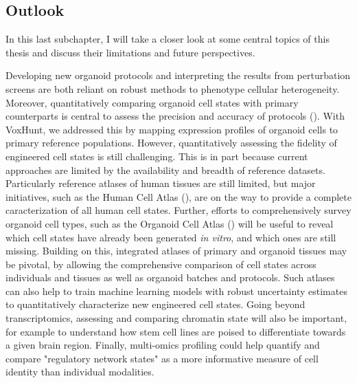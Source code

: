 \subsection{Outlook}

In this last subchapter, I will take a closer look at some central topics of this thesis and discuss their limitations and future perspectives.

Developing new organoid protocols and interpreting the results from perturbation screens are both reliant on robust methods to phenotype cellular heterogeneity. Moreover, quantitatively comparing organoid cell states with primary counterparts is central to assess the precision and accuracy of protocols (\cite{camp_single-cell_2018}). With VoxHunt, we addressed this by mapping expression profiles of organoid cells to primary reference populations. However, quantitatively assessing the fidelity of engineered cell states is still challenging. This is in part because current approaches are limited by the availability and breadth of reference datasets. Particularly reference atlases of human tissues are still limited, but major initiatives, such as the Human Cell Atlas (\cite{regev_human_2017}), are on the way to provide a complete caracterization of all human cell states. Further, efforts to comprehensively survey organoid cell types, such as the Organoid Cell Atlas (\cite{the_human_cell_atlas_biological_network_organoids_organoid_2021}) will be useful to reveal which cell states have already been generated \textit{in vitro}, and which ones are still missing. Building on this, integrated atlases of primary and organoid tissues may be pivotal, by allowing the comprehensive comparison of cell states across individuals and tissues as well as organoid batches and protocols. Such atlases can also help to train machine learning models with robust uncertainty estimates to quantitatively characterize new engineered cell states. Going beyond transcriptomics, assessing and comparing chromatin state will also be important, for example to understand how stem cell lines are poised to differentiate towards a given brain region. Finally, multi-omics profiling could help quantify and compare "regulatory network states" as a more informative measure of cell identity than individual modalities.

